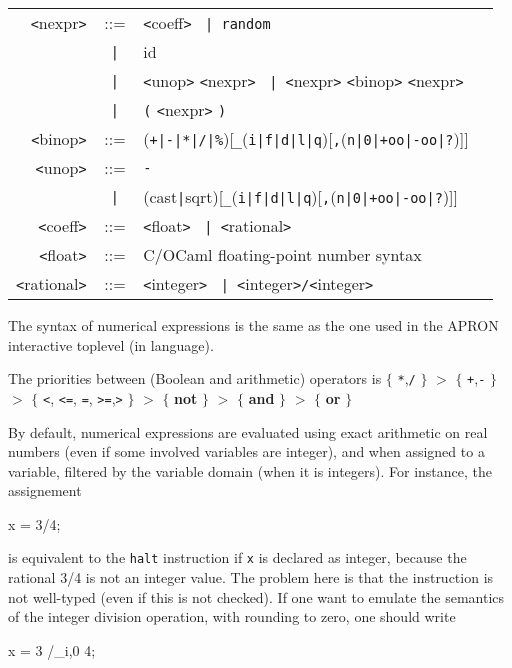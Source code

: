 \documentclass[a4paper,11pt]{article}
\newcommand{\pkw}[1]{\textcolor{progkeyword}{#1}}
\newcommand{\sx}[1]{\textcolor{prog}{\texttt{<}#1\texttt{>}}}
\newcommand{\kw}[1]{\textcolor{progkeyword}{\textbf{#1}}}
\newcommand{\tk}[1]{\textcolor{token}{\texttt{#1}}}
\newcommand{\sor}{\texttt{~|~}}
\newenvironment{syntax}
{
\T\medskip
\begin{tabular}{rcll}
}
{
\end{tabular}
\T\par\medskip
}
\newenvironment{prog}
{\begin{example}\color{prog}}
{\end{example}\par}
\newcommand{\ocaml}{\xlink{OCaml}{http://www.caml.org}\xspace}
\begin{document}
\begin{syntax}
  \sx{nexpr} &::=& \sx{coeff} \sor \tk{random} \\
  &\sor& id \\
  &\sor& \sx{unop} \sx{nexpr} \sor \sx{nexpr} \sx{binop} \sx{nexpr} \\
  &\sor& \tk{(} \sx{nexpr} \tk{)} \\
  \sx{binop} &::=& (\tk{+}\texttt{|}\tk{-}\texttt{|}\tk{*}\texttt{|}\tk{/}\texttt{|}\tk{\%})[\tk{\_}(\tk{i}\texttt{|}\tk{f}\texttt{|}\tk{d}\texttt{|}\tk{l}\texttt{|}\tk{q})[\tk{,}(\tk{n}\texttt{|}\tk{0}\texttt{|}\tk{+oo}\texttt{|}\tk{-oo}\texttt{|}\tk{?})]] \\
  \sx{unop} &::=& \tk{-} \\
  &\sor& (\pkw{cast}\texttt{|}\pkw{sqrt})[\tk{\_}(\tk{i}\texttt{|}\tk{f}\texttt{|}\tk{d}\texttt{|}\tk{l}\texttt{|}\tk{q})[\tk{,}(\tk{n}\texttt{|}\tk{0}\texttt{|}\tk{+oo}\texttt{|}\tk{-oo}\texttt{|}\tk{?})]] \\
  \sx{coeff} &::=& \sx{float} \sor \sx{rational} \\
  \sx{float} &::=& C/OCaml floating-point number syntax \\
  \sx{rational} &::=& \sx{integer} \sor \sx{integer}\tk{/}\sx{integer}
\end{syntax}
The syntax of numerical expressions is the same as the one used in
the APRON interactive toplevel (in \ocaml language).

The priorities between (Boolean and arithmetic) operators is
$\{$ \tk{*},\tk{/} $\}$
\textcolor{prog}{$>$} $\{$ \tk{+},\tk{-} $\}$
\textcolor{prog}{$>$} $\{$ \tk{<}, \tk{<=}, \tk{=}, \tk{>=},\tk{>} $\}$
\textcolor{prog}{$>$} $\{$ \kw{not} $\}$
\textcolor{prog}{$>$} $\{$ \kw{and} $\}$
\textcolor{prog}{$>$} $\{$ \kw{or} $\}$

By default, numerical expressions are evaluated using exact
arithmetic on real numbers (even if some involved variables are
integer), and when assigned to a variable, filtered by the
variable domain (when it is integers). For instance, the
assignement
\begin{prog}
  x = 3/4;
\end{prog}
\noindent is equivalent to the \texttt{halt} instruction if
\texttt{x} is declared as integer, because the rational 3/4 is not
an integer value. The problem here is that the instruction is not
well-typed (even if this is not checked). If one want to emulate
the semantics of the integer division operation, with rounding to
zero, one should write
\begin{prog}
  x = 3 /_i,0 4;
\end{prog}
\end{document}
